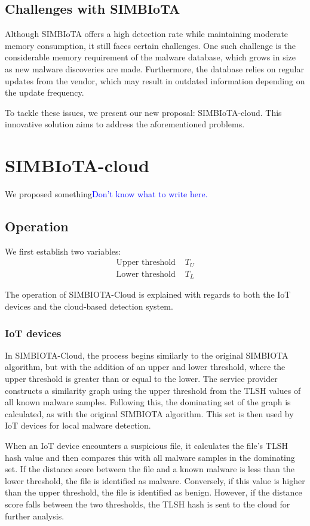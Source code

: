 \documentclass[
	a4paper, %
	10pt, %
	unnumberedsections, %
	twoside, %
]{LTJournalArticle}
\begin{document}
\subsection{Challenges with SIMBIoTA}
Although SIMBIoTA offers a high detection rate while maintaining moderate memory consumption, it still faces certain challenges. One such challenge is the considerable memory requirement of the malware database, which grows in size as new malware discoveries are made. Furthermore, the database relies on regular updates from the vendor, which may result in outdated information depending on the update frequency.

To tackle these issues, we present our new proposal: SIMBIoTA-cloud. This innovative solution aims to address the aforementioned problems.

\section{SIMBIoTA-cloud}
We proposed something\textcolor{blue}{Don't know what to write here.}

\subsection{Operation}
We first establish two variables:
\begin{align}
    \text{Upper threshold }& T_U \\
    \text{Lower threshold }& T_L
\end{align}

The operation of SIMBIOTA-Cloud is explained with regards to both the IoT devices and the cloud-based detection system.

\subsubsection{IoT devices}
In SIMBIOTA-Cloud, the process begins similarly to the original SIMBIOTA algorithm, but with the addition of an upper and lower threshold, where the upper threshold is greater than or equal to the lower. The service provider constructs a similarity graph using the upper threshold from the TLSH values of all known malware samples. Following this, the dominating set of the graph is calculated, as with the original SIMBIOTA algorithm. This set is then used by IoT devices for local malware detection. 

When an IoT device encounters a suspicious file, it calculates the file's TLSH hash value and then compares this with all malware samples in the dominating set. If the distance score between the file and a known malware is less than the lower threshold, the file is identified as malware. Conversely, if this value is higher than the upper threshold, the file is identified as benign. However, if the distance score falls between the two thresholds, the TLSH hash is sent to the cloud for further analysis.
\end{document}
